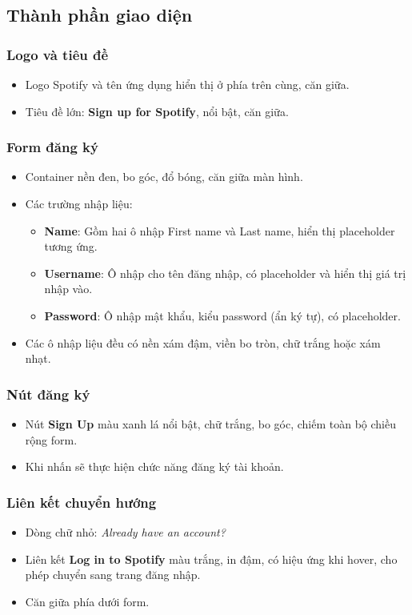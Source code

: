\documentclass{book}
\begin{document}
\subsection{Thành phần giao diện}

\subsubsection{Logo và tiêu đề}
\begin{itemize}
    \item Logo Spotify và tên ứng dụng hiển thị ở phía trên cùng, căn giữa.
    \item Tiêu đề lớn: \textbf{Sign up for Spotify}, nổi bật, căn giữa.
\end{itemize}

\subsubsection{Form đăng ký}
\begin{itemize}
    \item Container nền đen, bo góc, đổ bóng, căn giữa màn hình.
    \item Các trường nhập liệu:
    \begin{itemize}
        \item \textbf{Name}: Gồm hai ô nhập First name và Last name, hiển thị placeholder tương ứng.
        \item \textbf{Username}: Ô nhập cho tên đăng nhập, có placeholder và hiển thị giá trị nhập vào.
        \item \textbf{Password}: Ô nhập mật khẩu, kiểu password (ẩn ký tự), có placeholder.
    \end{itemize}
    \item Các ô nhập liệu đều có nền xám đậm, viền bo tròn, chữ trắng hoặc xám nhạt.
\end{itemize}

\subsubsection{Nút đăng ký}
\begin{itemize}
    \item Nút \textbf{Sign Up} màu xanh lá nổi bật, chữ trắng, bo góc, chiếm toàn bộ chiều rộng form.
    \item Khi nhấn sẽ thực hiện chức năng đăng ký tài khoản.
\end{itemize}

\subsubsection{Liên kết chuyển hướng}
\begin{itemize}
    \item Dòng chữ nhỏ: \textit{Already have an account?}
    \item Liên kết \textbf{Log in to Spotify} màu trắng, in đậm, có hiệu ứng khi hover, cho phép chuyển sang trang đăng nhập.
    \item Căn giữa phía dưới form.
\end{itemize}
\end{document}
